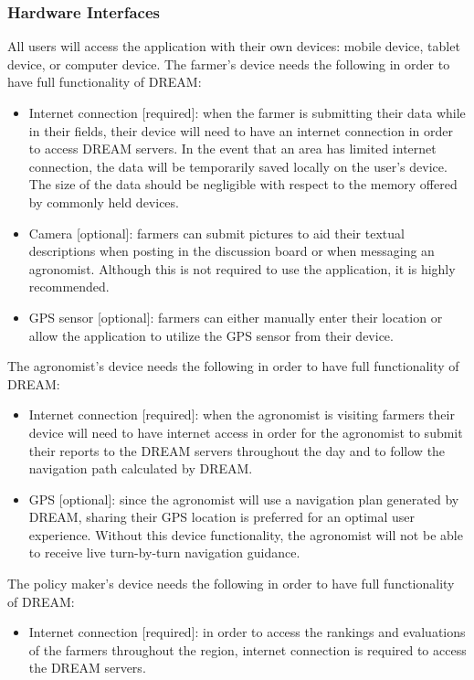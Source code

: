 \subsubsection{Hardware Interfaces}
\begin{flushleft}
All users will access the application with their own devices: mobile device, tablet device, or computer device.
The farmer's device needs the following in order to have full functionality of DREAM:
\begin{itemize}
\item Internet connection [required]: when the farmer is submitting their data while in their fields, their device will need to have an internet connection in order to access DREAM servers. In the event that an area has limited internet connection, the data will be temporarily saved locally on the user's device. The size of the data should be negligible with respect to the memory offered by commonly held devices.
\item Camera [optional]: farmers can submit pictures to aid their textual descriptions when posting in the discussion board or when messaging an agronomist. Although this is not required to use the application, it is highly recommended.
\item GPS sensor [optional]: farmers can either manually enter their location or allow the application to utilize the GPS sensor from their device.
\end{itemize}

The agronomist's device needs the following in order to have full functionality of DREAM:
\begin{itemize}
\item Internet connection [required]: when the agronomist is visiting farmers their device will need to have internet access in order for the agronomist to submit their reports to the DREAM servers throughout the day and to follow the navigation path calculated by DREAM.
\item GPS [optional]: since the agronomist will use a navigation plan generated by DREAM, sharing their GPS location is preferred for an optimal user experience. Without this device functionality, the agronomist will not be able to receive live turn-by-turn navigation guidance.
\end{itemize}

The policy maker's device needs the following in order to have full functionality of DREAM:
\begin{itemize}
\item Internet connection [required]: in order to access the rankings and evaluations of the farmers throughout the region, internet connection is required to access the DREAM servers.
\end{itemize}
\end{flushleft}

